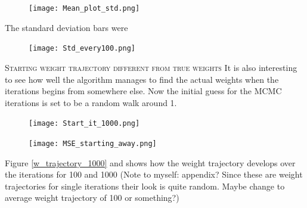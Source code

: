 \begin{figure}[hbt!]
    \centering
    \texttt{[image: Mean\_plot\_std.png]}
\end{figure}

The standard deviation bars were 

\begin{figure}[hbt!]
    \centering
    \texttt{[image: Std\_every100.png]}
\end{figure}

\textsc{Starting weight trajectory different from true weights}
It is also interesting to see how well the algorithm manages to find the actual weights when the iterations begins from somewhere else. Now the initial guess for the MCMC iterations is set to be a random walk around 1.

\begin{figure}[hbt!]
    \centering
    \texttt{[image: Start\_it\_1000.png]}
\end{figure}


\begin{figure}[hbt!]
    \centering
    \texttt{[image: MSE\_starting\_away.png]}
\end{figure}

Figure \ref{w_trajectory_1000} and  shows how the weight trajectory develops over the iterations for 100 and 1000  (Note to myself: appendix? Since these are weight trajectories for single iterations their look is quite random. Maybe change to average weight trajectory of 100 or something?)

